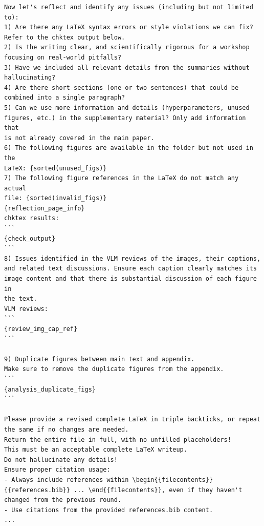 \documentclass[11pt, a4paper]{include/gdm_format}
\begin{document}
\begin{tcolorbox}[breakable, colback=orange!5!white, colframe=orange!75!black, title=Writeup Reflection Prompt]
\small
\begin{verbatim}
Now let's reflect and identify any issues (including but not limited to):
1) Are there any LaTeX syntax errors or style violations we can fix? 
Refer to the chktex output below.
2) Is the writing clear, and scientifically rigorous for a workshop 
focusing on real-world pitfalls?
3) Have we included all relevant details from the summaries without 
hallucinating?
4) Are there short sections (one or two sentences) that could be 
combined into a single paragraph?
5) Can we use more information and details (hyperparameters, unused 
figures, etc.) in the supplementary material? Only add information that 
is not already covered in the main paper.
6) The following figures are available in the folder but not used in the 
LaTeX: {sorted(unused_figs)}
7) The following figure references in the LaTeX do not match any actual 
file: {sorted(invalid_figs)}
{reflection_page_info}
chktex results:
```
{check_output}
```
8) Issues identified in the VLM reviews of the images, their captions, 
and related text discussions. Ensure each caption clearly matches its 
image content and that there is substantial discussion of each figure in 
the text.
VLM reviews:
```
{review_img_cap_ref}
```

9) Duplicate figures between main text and appendix. 
Make sure to remove the duplicate figures from the appendix.
```
{analysis_duplicate_figs}
```

Please provide a revised complete LaTeX in triple backticks, or repeat 
the same if no changes are needed.
Return the entire file in full, with no unfilled placeholders!
This must be an acceptable complete LaTeX writeup.
Do not hallucinate any details!
Ensure proper citation usage:
- Always include references within \begin{{filecontents}}
{{references.bib}} ... \end{{filecontents}}, even if they haven't 
changed from the previous round.
- Use citations from the provided references.bib content.
...
\end{verbatim}
\end{tcolorbox}
\end{document}
